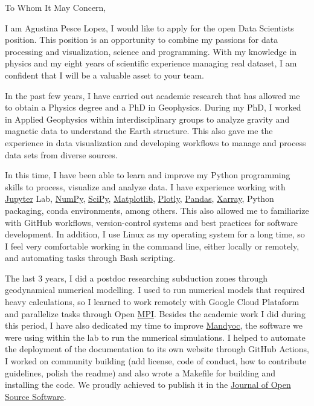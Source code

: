 \documentclass[a4paper]{letter}
\newcommand{\mandyoc}{\href{https://github.com/ggciag/mandyoc}{Mandyoc}}
\newcommand{\xarray}{\href{https://xarray.dev/}{Xarray}}
\newcommand{\matplotlib}{\href{https://matplotlib.org/}{Matplotlib}}
\newcommand{\numpy}{\href{https://numpy.org/}{NumPy}}
\newcommand{\pandas}{\href{https://pandas.pydata.org/}{Pandas}}
\newcommand{\plotly}{\href{https://plotly.com/python/}{Plotly}}
\newcommand{\scipy}{\href{https://scipy.org/}{SciPy}}
\newcommand{\jupyter}{\href{https://jupyter.org/}{Jupyter}}
\begin{document}
    \begin{letter}{}

    \date{\today}

    \opening{\noindent To Whom It May Concern,}

    I am Agustina Pesce Lopez, I would like to apply for the open Data
    Scientists position.
    This position is an opportunity to combine my passions for data processing
    and visualization, science and programming.
    With my knowledge in physics and my eight years of scientific experience
    managing real dataset, I am confident that I will be a valuable asset to
    your team.

    In the past few years, I have carried out academic research that has
    allowed me to obtain a Physics degree and a PhD in Geophysics.
    During my PhD, I worked in Applied Geophysics within interdisciplinary
    groups to analyze gravity and magnetic data to understand the Earth
    structure.
    This also gave me the experience in data visualization and developing
    workflows to manage and process data sets from diverse sources.

    In this time, I have been able to learn and improve my Python programming
    skills to process, visualize and analyze data.
    I have experience working with \jupyter{} Lab, \numpy{}, \scipy{},
    \matplotlib{}, \plotly{}, \pandas{}, \xarray{}, Python packaging, conda
    environments, among others.
    This also allowed me to familiarize with GitHub workflows, version-control
    systems and best practices for software development.
    In addition, I use Linux as my operating system for a long time, so I feel
    very comfortable working in the command line, either locally or remotely,
    and automating tasks through Bash scripting.

    The last 3 years, I did a postdoc researching subduction zones through
    geodynamical numerical modelling.
    I used to run numerical models that required heavy calculations, so I
    learned to work remotely with Google Cloud Plataform and parallelize
    tasks through Open \href{https://www.open-mpi.org/}{MPI}.
    Besides the academic work I did during this period, I have also dedicated
    my time to improve \mandyoc{}, the software we were using within the lab to
    run the numerical simulations.
    I helped to automate the deployment of the documentation to its own website
    through GitHub Actions, I worked on community building (add license, code
    of conduct, how to contribute guidelines, polish the readme) and also
    wrote a Makefile for building and installing the code.
    We proudly achieved to publish it in the
    \href{https://joss.theoj.org/papers/10.21105/joss.04070}{Journal of Open
    Source Software}.


\end{letter}
\end{document}

